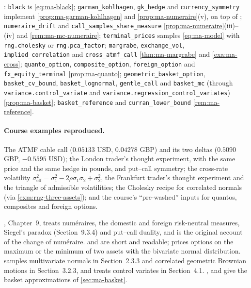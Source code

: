 
\begin{incode}
: \texttt{black} is \eqref{eq:ma-black};
\texttt{garman\_kohlhagen}, \texttt{gk\_hedge} and \texttt{currency\_symmetry} implement
\cref{prop:ma-garman-kohlhagen} and \cref{prop:ma-numeraire}(v), on top of
; \texttt{numeraire\_drift} and \texttt{call\_samples\_share\_measure}
\cref{prop:ma-numeraire}(iii)--(iv) and \cref{rem:ma-mc-numeraire}; \texttt{terminal\_prices} samples
\eqref{eq:ma-model} with \texttt{rng.cholesky} or \texttt{rng.pca\_factor}; \texttt{margrabe},
\texttt{exchange\_vol}, \texttt{implied\_correlation} and \texttt{cross\_atmf\_call}
\cref{thm:ma-margrabe} and \cref{exa:ma-cross}; \texttt{quanto\_option}, \texttt{composite\_option},
\texttt{foreign\_option} and \texttt{fx\_equity\_terminal} \cref{prop:ma-quanto};
\texttt{geometric\_basket\_option}, \texttt{basket\_cv\_bound}, \texttt{basket\_lognormal},
\texttt{gentle\_call} and \texttt{basket\_mc} (through \texttt{variance.control\_variate} and
\texttt{variance.regression\_control\_variates}) \cref{prop:ma-basket}; \texttt{basket\_reference} and
\texttt{curran\_lower\_bound} \cref{rem:ma-reference}.
\end{incode}

\paragraph{Course examples reproduced.} The ATMF cable call ($0.05133$ USD, $0.04278$ GBP) and its
two deltas ($0.5090$ GBP, $-0.5595$ USD); the London trader's thought experiment, with the same
price and the same hedge in pounds, and put--call symmetry; the cross-rate volatility
$\sigma_{\mathrm{eff}}^2=\sigma_1^2-2\rho\sigma_1\sigma_2+\sigma_2^2$, the Frankfurt trader's
thought experiment and the triangle of admissible volatilities; the Cholesky recipe for correlated
normals (via \cref{exm:rng-three-assets}); and the course's ``pre-washed'' inputs for quantos,
composites and foreign options.

\furtherreading
\textcite{shreve2}, Chapter~9, treats num\'eraires, the domestic and foreign risk-neutral measures,
Siegel's paradox (Section~9.3.4) and put--call duality, and \textcite{geman-elkaroui-rochet} is the
original account of the change of num\'eraire. \textcite{garman-kohlhagen} and \textcite{margrabe} are
short and readable; \textcite{stulz-1982} prices options on the maximum or the minimum of two assets
with the bivariate normal distribution. \textcite{glasserman-mc} samples multivariate normals in
Section~2.3.3 and correlated geometric Brownian motions in Section~3.2.3, and treats control variates in
Section~4.1. \textcite{levy-1992}, \textcite{gentle-basket} and \textcite{curran} give the basket
approximations of \cref{sec:ma-basket}.
